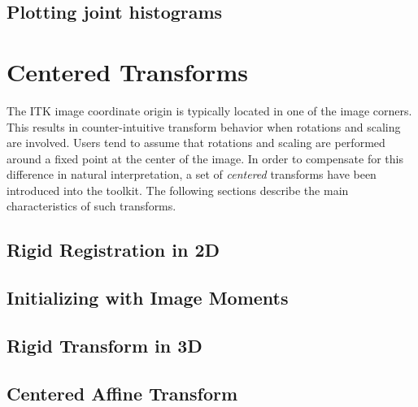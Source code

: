 \subsection{Plotting joint histograms}
\label{sec:JointHistograms}
\ifitkFullVersion



\section{ Centered Transforms }

The ITK image coordinate origin is typically located in one of the image
corners. This results in counter-intuitive transform behavior when
rotations and scaling are involved. Users tend to assume that rotations and
scaling are performed around a fixed point at the center of the image.  In
order to compensate for this difference in natural interpretation, a set of
\emph{centered} transforms have been introduced into the toolkit. The following
sections describe the main characteristics of such transforms.

\subsection{Rigid Registration in 2D}
\label{sec:RigidRegistrationIn2D}
\ifitkFullVersion

\fi

\subsection{Initializing with Image Moments}
\label{sec:InitializingRegistrationWithMoments}
\ifitkFullVersion

\fi



%



\subsection{Rigid Transform in 3D}
\label{sec:RigidRegistrationIn3D}
\ifitkFullVersion

\fi




\subsection{Centered Affine Transform}
\label{sec:CenteredAffineTransform}
\ifitkFullVersion

\fi





